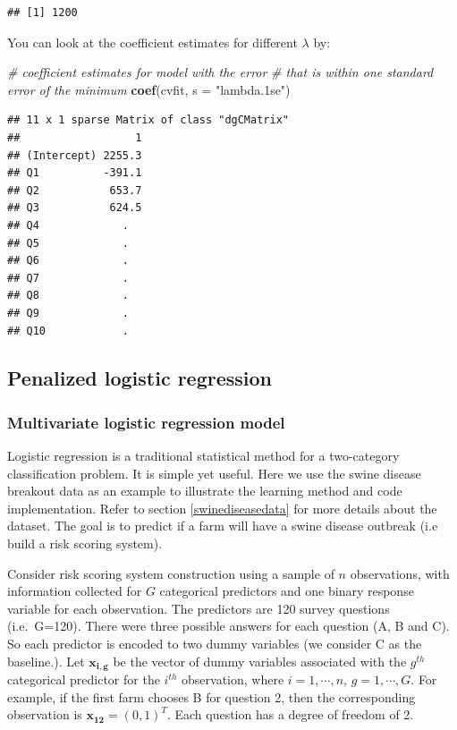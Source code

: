 \documentclass[12pt,]{krantz}
\makeatletter
\newenvironment{Shaded}{\begin{snugshade}}{\end{snugshade}}
\newcommand{\CommentTok}[1]{\textcolor[rgb]{0.37,0.37,0.37}{\textit{#1}}}
\newcommand{\DataTypeTok}[1]{\textcolor[rgb]{0.27,0.27,0.27}{#1}}
\newcommand{\KeywordTok}[1]{\textcolor[rgb]{0.27,0.27,0.27}{\textbf{#1}}}
\newcommand{\NormalTok}[1]{#1}
\newcommand{\StringTok}[1]{\textcolor[rgb]{0.5,0.5,0.5}{#1}}
\newenvironment{kframe}{%
\medskip{}
\setlength{\fboxsep}{.8em}
 \def\at@end@of@kframe{}%
 \ifinner\ifhmode%
  \def\at@end@of@kframe{\end{minipage}}%
  \begin{minipage}{\columnwidth}%
 \fi\fi%
 \def\FrameCommand##1{\hskip\@totalleftmargin \hskip-\fboxsep
 \colorbox{shadecolor}{##1}\hskip-\fboxsep
     \hskip-\linewidth \hskip-\@totalleftmargin \hskip\columnwidth}%
 \MakeFramed {\advance\hsize-\width
   \@totalleftmargin\z@ \linewidth\hsize
   \@setminipage}}%
 {\par\unskip\endMakeFramed%
 \at@end@of@kframe}
\renewenvironment{Shaded}{\begin{kframe}}{\end{kframe}}
\makeatother
\begin{document}
\begin{verbatim}
## [1] 1200
\end{verbatim}

You can look at the coefficient estimates for different \(\lambda\) by:

\begin{Shaded}
\begin{Highlighting}[]
\CommentTok{# coefficient estimates for model with the error }
\CommentTok{# that is within one standard error of the minimum}
\KeywordTok{coef}\NormalTok{(cvfit, }\DataTypeTok{s =} \StringTok{"lambda.1se"}\NormalTok{)}
\end{Highlighting}
\end{Shaded}

\begin{verbatim}
## 11 x 1 sparse Matrix of class "dgCMatrix"
##                  1
## (Intercept) 2255.3
## Q1          -391.1
## Q2           653.7
## Q3           624.5
## Q4             .  
## Q5             .  
## Q6             .  
## Q7             .  
## Q8             .  
## Q9             .  
## Q10            .
\end{verbatim}

\hypertarget{penalized-logistic-regression}{%
\subsection{Penalized logistic regression}\label{penalized-logistic-regression}}

\hypertarget{multivariate-logistic-regression-model}{%
\subsubsection{Multivariate logistic regression model}\label{multivariate-logistic-regression-model}}

Logistic regression is a traditional statistical method for a two-category classification problem. It is simple yet useful. Here we use the swine disease breakout data as an example to illustrate the learning method and code implementation. Refer to section \ref{swinediseasedata} for more details about the dataset. The goal is to predict if a farm will have a swine disease outbreak (i.e build a risk scoring system).

Consider risk scoring system construction using a sample of \(n\) observations, with information collected for \(G\) categorical predictors and one binary response variable for each observation. The predictors are 120 survey questions (i.e.~G=120). There were three possible answers for each question (A, B and C). So each predictor is encoded to two dummy variables (we consider C as the baseline.). Let \(\mathbf{x_{i,g}}\) be the vector of dummy variables associated with the \(g^{th}\) categorical predictor for the \(i^{th}\) observation, where \(i=1,\cdots,n\), \(g=1,\cdots,G\). For example, if the first farm chooses B for question 2, then the corresponding observation is \(\mathbf{x_{12}}=(0,1)^{T}\). Each question has a degree of freedom of 2.
\end{document}
